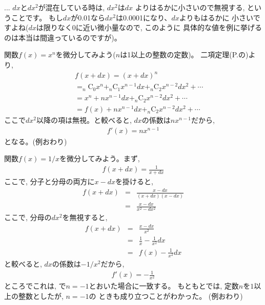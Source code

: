\begin{faq}{\small{} ... $dx$と$dx^2$が混在している時は, $dx^2$は$dx$
よりはるかに小さいので無視する, ということです。
もし$dx$が0.01なら$dx^2$は0.0001になり、$dx$よりもはるかに
小さいですよね($dx$は限りなく0に近い微小量なので, このように
具体的な値を例に挙げるのは本当は間違っているのですが)。
}\end{faq}

\begin{exmpl} 関数$f(x)=x^n$を微分してみよう($n$は1以上の整数の定数)。
二項定理(P.\pageref{eq:binomth2}の)より, 
\begin{eqnarray}
&&f(x+dx)=(x+dx)^n\nonumber\\
&&=_n\text{C}_0x^n+_n\text{C}_1x^{n-1}dx +_n\text{C}_2x^{n-2}dx^2+\cdots\nonumber\\
&&=x^n+nx^{n-1}dx +_n\text{C}_2x^{n-2}dx^2+\cdots\nonumber\\
&&=f(x)+nx^{n-1}dx +_n\text{C}_2x^{n-2}dx^2+\cdots
\end{eqnarray}
ここで$dx^2$以降の項は無視。と較べると, $dx$の係数は$nx^{n-1}$だから, 
\begin{eqnarray}
f'(x)=nx^{n-1}\label{eq:diff_x}
\end{eqnarray}となる。(例おわり)\end{exmpl}
\hv

\begin{exmpl}\label{ex:1overxderiv} 関数$f(x)=1/x$を微分してみよう。まず, 
\begin{eqnarray}f(x+dx)=\frac{1}{x+dx}\end{eqnarray}
ここで, 分子と分母の両方に$x-dx$を掛けると, 
\begin{eqnarray}
f(x+dx)&=&\frac{x-dx}{(x+dx)(x-dx)}\nonumber\\
      &=&\frac{x-dx}{x^2-dx^2}
\end{eqnarray}
ここで, 分母の$dx^2$を無視すると, 
\begin{eqnarray}
f(x+dx)&=& \frac{x-dx}{x^2}\nonumber\\
      &=&\frac{1}{x}-\frac{1}{x^2}dx\nonumber\\
      &=&f(x)-\frac{1}{x^2}dx
\end{eqnarray}
と較べると, $dx$の係数は$-1/x^2$だから, 
\begin{eqnarray}
f'(x)=-\frac{1}{x^2}\label{eq:dif_recipr}
\end{eqnarray}
ところでこれは, で$n=-1$とおいた場合に一致する。
もともとでは, 定数$n$を$1$以上の整数としたが, $n=-1$の
ときも成り立つことがわかった。
(例おわり)\end{exmpl}
\vv



